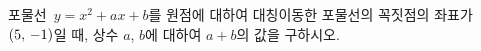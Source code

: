 포물선~$y=x^2+ax+b$를 원점에 대하여 대칭이동한 포물선의 꼭짓점의 좌표가 $(5,\mkern3mu -1)$일 때, 상수 $a$, $b$에 대하여 $a+b$의 값을 구하시오.
